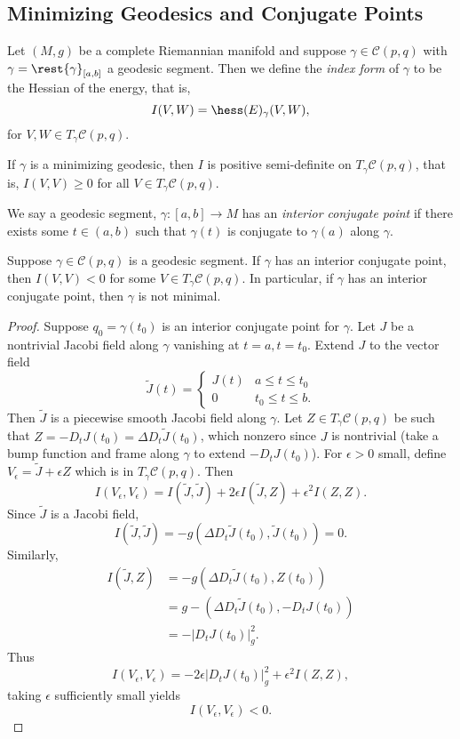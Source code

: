 \subsection{Minimizing Geodesics and Conjugate Points}

Let $(M,g)$ be a complete Riemannian manifold and suppose $\gamma\in\mathcal{C}(p,q)$ with $\gamma=\rest{\gamma}_{[a,b]}$ a geodesic segment.  Then we define the \textit{index form} of $\gamma$ to be the Hessian of the energy, that is, 
$$I(V,W)=\hess(E)_\gamma(V,W),$$
for $V,W\in T_\gamma\mathcal{C}(p,q)$.

\begin{cor}
    If $\gamma$ is a minimizing geodesic, then $I$ is positive semi-definite on $T_\gamma\mathcal{C}(p,q)$, that is, $I(V,V)\geq0$ for all $V\in T_\gamma\mathcal{C}(p,q)$.
\end{cor}

We say a geodesic segment, $\gamma:[a,b]\to M$ has an \textit{interior conjugate point} if there exists some $t\in(a,b)$ such that $\gamma(t)$ is conjugate to $\gamma(a)$ along $\gamma$.

\begin{thm}\label{thm:interiorConjugate}
    Suppose $\gamma\in\mathcal{C}(p,q)$ is a geodesic segment.  If $\gamma$ has an interior conjugate point, then $I(V,V)<0$ for some $V\in T_\gamma\mathcal{C}(p,q)$.  In particular, if $\gamma$ has an interior conjugate point, then $\gamma$ is not minimal.
\end{thm}

\begin{proof}
Suppose $q_0=\gamma(t_0)$ is an interior conjugate point for $\gamma$.  Let $J$ be a nontrivial Jacobi field along $\gamma$ vanishing at $t=a, t=t_0$.  Extend $J$ to the vector field
$$\tilde{J}(t)=\begin{cases}
J(t)&a\leq t\leq t_0\\
0&t_0\leq t\leq b.	
\end{cases}$$
Then $\tilde{J}$ is a piecewise smooth Jacobi field along $\gamma$.  Let $Z\in T_\gamma\mathcal{C}(p,q)$ be such that $Z=-D_tJ(t_0)=\Delta D_t\tilde{J}(t_0)$, which nonzero since $J$ is nontrivial (take a bump function and frame along $\gamma$ to extend $-D_tJ(t_0)$).  For $\epsilon>0$ small, define $V_\epsilon=\tilde{J}+\epsilon Z$ which is in $T_\gamma\mathcal{C}(p,q)$.  Then
$$I(V_\epsilon,V_\epsilon)=I(\tilde{J},\tilde{J})+2\epsilon I(\tilde{J},Z)+\epsilon^2I(Z,Z).$$
Since $\tilde{J}$ is a Jacobi field,
$$I(\tilde{J},\tilde{J})=-g(\Delta D_t\tilde{J}(t_0),\tilde{J}(t_0))=0.$$
Similarly,
\begin{align*}
	I(\tilde{J},Z)&=-g(\Delta D_t\tilde{J}(t_0),Z(t_0))\\
	&=g-(\Delta D_t\tilde{J}(t_0),-D_tJ(t_0))\\
	&=-|D_tJ(t_0)|_g^2.
\end{align*}
Thus
$$I(V_\epsilon,V_\epsilon)=-2\epsilon|D_tJ(t_0)|_g^2+\epsilon^2I(Z,Z),$$
taking $\epsilon$ sufficiently small yields
$$I(V_\epsilon,V_\epsilon)<0.$$

\end{proof}

